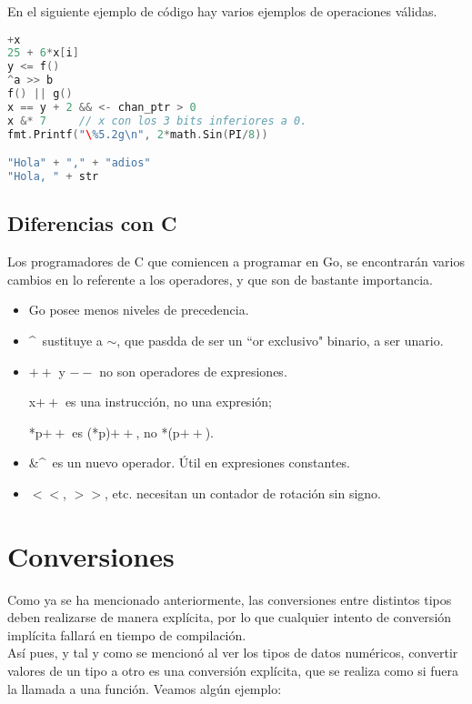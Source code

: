 	En el siguiente ejemplo de código hay varios ejemplos de operaciones válidas.

\begin{minipage}{17.1cm}
\begin{lstlisting}[language=go,numbers=none, caption=Operaciones válidas, label=ejops]
+x
25 + 6*x[i]
y <= f()
^a >> b
f() || g()
x == y + 2 && <- chan_ptr > 0
x &* 7     // x con los 3 bits inferiores a 0.
fmt.Printf("\%5.2g\n", 2*math.Sin(PI/8))

"Hola" + "," + "adios"
"Hola, " + str
\end{lstlisting}
\end{minipage}

	\subsection{Diferencias con C}

	Los programadores de C que comiencen a programar en Go, se encontrarán
	varios cambios en lo referente a los operadores, y que son de bastante
	importancia.

	\begin{itemize}
		\item Go posee menos niveles de precedencia.
		\item \textasciicircum\ sustituye a $\sim$, que pasdda de ser un ``or
		exclusivo" binario, a ser unario.
		\item $++$ y $--$ no son operadores de expresiones.

			x$++$ es una instrucción, no una expresión;

			*p$++$ es (*p)$++$, no *(p$++$).
		\item \&\textasciicircum \ es un nuevo operador. Útil en expresiones
		constantes.
		\item $<<$, $>>$, etc. necesitan un contador de rotación sin signo.
	\end{itemize}

\section{Conversiones}

Como ya se ha mencionado anteriormente, las conversiones entre distintos tipos
deben realizarse de manera explícita, por lo que cualquier intento de conversión
implícita fallará en tiempo de compilación.\\

Así pues, y tal y como se mencionó al ver los tipos de datos numéricos,
convertir valores de un tipo a otro es una conversión explícita, que se realiza
como si fuera la llamada a una función. Veamos algún ejemplo:

